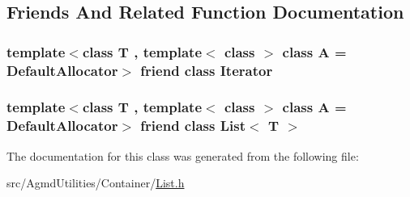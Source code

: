 \subsection{Friends And Related Function Documentation}
\hypertarget{class_agmd_utilities_1_1_list_1_1_const_iterator_a9830fc407400559db7e7783cc10a9394}{
\subsubsection[{Iterator}]{\setlength{\rightskip}{0pt plus 5cm}template$<$class T , template$<$ class $>$ class A = Default\+Allocator$>$ friend class {\bf Iterator}\hspace{0.3cm}{\ttfamily [friend]}}}\label{class_agmd_utilities_1_1_list_1_1_const_iterator_a9830fc407400559db7e7783cc10a9394}
\hypertarget{class_agmd_utilities_1_1_list_1_1_const_iterator_adfa51a0eca1eba953f68ca3f65cdaa05}{
\subsubsection[{List$<$ T $>$}]{\setlength{\rightskip}{0pt plus 5cm}template$<$class T , template$<$ class $>$ class A = Default\+Allocator$>$ friend class {\bf List}$<$ T $>$\hspace{0.3cm}{\ttfamily [friend]}}}\label{class_agmd_utilities_1_1_list_1_1_const_iterator_adfa51a0eca1eba953f68ca3f65cdaa05}


The documentation for this class was generated from the following file\+:\begin{DoxyCompactItemize}
\item 
src/\+Agmd\+Utilities/\+Container/\hyperlink{_agmd_utilities_2_container_2_list_8h}{List.\+h}\end{DoxyCompactItemize}
